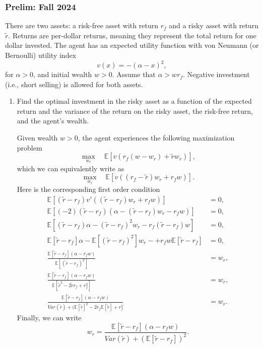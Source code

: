 \documentclass[11pt,english]{article}
\begin{document}
\subsubsection{Prelim: Fall 2024}\label{Werner Prelim: Fall 2024}
There are two assets: a risk-free asset with return $r_f$ and a risky asset
with return $\tilde{r}$. Returns are per-dollar returns, meaning they represent
the total return for one dollar invested. The agent has an expected utility
function with von Neumann (or Bernoulli) utility index
\[
    v(x) = -(\alpha - x)^2,
\]
for $\alpha > 0$, and initial wealth $w > 0$. Assume that $\alpha > wr_f$.
Negative investment (i.e., short selling) is allowed for both assets.
 
\begin{enumerate}
    \item[(a)] Find the optimal investment in the risky asset as a function of
        the expected return and the variance of the return on the risky asset,
        the risk-free return, and the agent's wealth.
    \begin{solution}
 Given wealth $w > 0$, the agent experiences the following maximization problem
$$\max_{w_r}\quad \mathbb{E}\left[v(r_f(w - w_r) + \tilde{r}w_r)\right],$$which we can equivalently write as $$\max_{w_r}\quad \mathbb{E}\left[v((r_f - \tilde{r})w_r + r_fw)\right].$$ Here is the corresponding first order condition
\begin{align*}
\mathbb{E}\left[(\tilde{r} - r_f) v'((\tilde{r} - r_f)w_r + r_fw)\right] &= 0,\\
\mathbb{E}\left[(-2)(\tilde{r} - r_f)(\alpha - (\tilde{r} - r_f)w_r - r_fw)\right]&= 0,\\
\mathbb{E}\left[(\tilde{r} - r_f)\alpha - (\tilde{r} - r_f)^2w_r - r_f(\tilde{r} - r_f)w\right]&= 0,\\
\mathbb{E}[\tilde{r} - r_f]\alpha -\mathbb{E}[(\tilde{r} - r_f)^2]w_r-+ r_fw\mathbb{E}[\tilde{r} - r_f]&= 0,\\
\frac{\mathbb{E}[\tilde{r} - r_f](\alpha - r_f w)}{\mathbb{E}[(\tilde{r} - r_f)^2]} &= w_r,\\
\frac{\mathbb{E}[\tilde{r} - r_f](\alpha - r_f w)}{\mathbb{E}[\tilde{r}^2 - 2\tilde{r}r_f + r^2_f]} &= w_r,\\ 
\frac{\mathbb{E}[\tilde{r} - r_f](\alpha - r_f w)}{Var(\tilde{r}) + (\mathbb{E}[\tilde{r}]^2 - 2r_f\mathbb{E}[\tilde{r}] + r_f^2} &= w_r.
\end{align*}Finally, we can write $$\boxed{w_r = \frac{\mathbb{E}[\tilde{r} - r_f](\alpha - r_f w)}{Var(\tilde{r}) + \left(\mathbb{E}[\tilde{r} - r_f]\right)^2}.}$$
\end{solution}
\end{enumerate}
 
\end{document}
